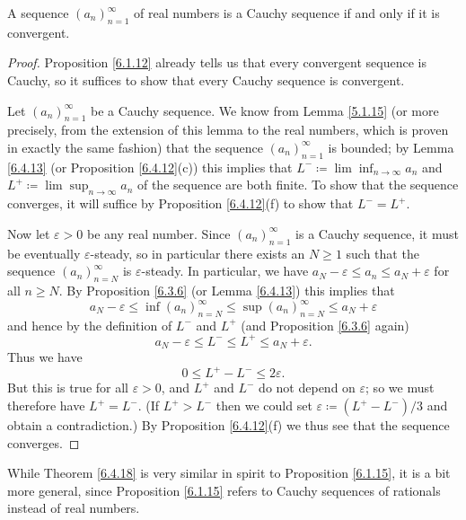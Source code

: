 \begin{theorem}\label{6.4.18}
    A sequence \((a_n)_{n = 1}^\infty\) of real numbers is a Cauchy sequence if and only if it is convergent.
\end{theorem}

\begin{proof}
    Proposition \ref{6.1.12} already tells us that every convergent sequence is Cauchy, so it suffices to show that every Cauchy sequence is convergent.

    Let \((a_n)_{n = 1}^\infty\) be a Cauchy sequence.
    We know from Lemma \ref{5.1.15} (or more precisely, from the extension of this lemma to the real numbers, which is proven in exactly the same fashion) that the sequence \((a_n)_{n = 1}^\infty\) is bounded;
    by Lemma \ref{6.4.13} (or Proposition \ref{6.4.12}(c)) this implies that \(L^- \coloneqq \lim\inf_{n \to \infty} a_n\) and \(L^+ \coloneqq \lim\sup_{n \to \infty} a_n\) of the sequence are both finite.
    To show that the sequence converges, it will suffice by Proposition \ref{6.4.12}(f) to show that \(L^- = L^+\).

    Now let \(\varepsilon > 0\) be any real number.
    Since \((a_n)_{n = 1}^\infty\) is a Cauchy sequence, it must be eventually \(\varepsilon\)-steady, so in particular there exists an \(N \geq 1\) such that the sequence \((a_n)_{n = N}^\infty\) is \(\varepsilon\)-steady.
    In particular, we have \(a_N - \varepsilon \leq a_n \leq a_N + \varepsilon\) for all \(n \geq N\).
    By Proposition \ref{6.3.6} (or Lemma \ref{6.4.13}) this implies that
    \[
        a_N - \varepsilon \leq \inf(a_n)_{n = N}^\infty \leq \sup(a_n)_{n = N}^\infty \leq a_N + \varepsilon
    \]
    and hence by the definition of \(L^-\) and \(L^+\) (and Proposition \ref{6.3.6} again)
    \[
        a_N - \varepsilon \leq L^- \leq L^+ \leq a_N + \varepsilon.
    \]
    Thus we have
    \[
        0 \leq L^+ - L^- \leq 2\varepsilon.
    \]
    But this is true for all \(\varepsilon > 0\), and \(L^+\) and \(L^-\) do not depend on \(\varepsilon\);
    so we must therefore have \(L^+ = L^-\).
    (If \(L^+ > L^-\) then we could set \(\varepsilon \coloneqq (L^+ - L^-) / 3\) and obtain a contradiction.)
    By Proposition \ref{6.4.12}(f) we thus see that the sequence converges.
\end{proof}

\begin{remark}\label{6.4.19}
    While Theorem \ref{6.4.18} is very similar in spirit to Proposition \ref{6.1.15}, it is a bit more general, since Proposition \ref{6.1.15} refers to Cauchy sequences of rationals instead of real numbers.
\end{remark}

